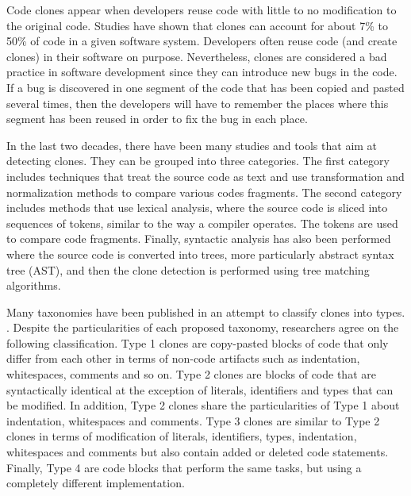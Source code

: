 Code clones appear when developers reuse code with little to no modification to the original code.
Studies have shown  that clones can account for about 7\% to 50\% of code in a given software system\cite{Baker, StephaneDucasse}.
Developers often reuse code (and create clones) in their software on purpose\cite{Kim2005}.
Nevertheless, clones are considered a bad practice in software development since they can introduce new bugs in the code\cite{Kapser2006,Juergens2009,Li2006}.
If a  bug is discovered in one segment of the code that has been copied and pasted several times, then the developers will have to remember the places where this segment has been reused in order to fix the bug in each place.

In the last two decades, there have been many studies and tools that aim at detecting clones. They can be grouped into three categories.
The first category includes techniques that treat the source code as text and use transformation and normalization methods to compare various codes fragments\cite{Johnson1994,Johnson1993, Cordy2011, Roy2008}.
The second category includes methods that
use lexical analysis, where the source code is sliced into sequences of tokens, similar to the way a compiler operates\cite{Baker,Bakera,Baker2002,Kamiya2002,Li2006}.
The tokens are used to compare code fragments.
Finally, syntactic analysis has also been performed where the source code is converted into trees, more particularly abstract syntax tree (AST), and then the clone detection is performed using tree matching algorithms\cite{Baxter1998, Komondoor2000, Tairas2006, Falke2008}.

Many taxonomies have been published in an attempt to classify clones into types. \cite{Mayrand1996,Balazinska1999,Koschke2006,Bellon2007,Kontogiannis,Kapser}.
Despite the particularities of each proposed taxonomy, researchers agree on the following classification.
Type 1 clones are copy-pasted blocks of code that only differ from each other in terms of non-code artifacts such as indentation, whitespaces, comments and so on.
Type 2 clones are blocks of code that are syntactically identical at the exception of literals, identifiers and types that can be modified.
In addition, Type 2 clones share the particularities of Type 1 about indentation, whitespaces and comments.
Type 3 clones are similar to Type 2 clones in terms of modification of literals, identifiers, types, indentation, whitespaces and comments but also contain added or deleted code statements.
Finally, Type 4 are code blocks that perform the same tasks, but using a completely different implementation.

